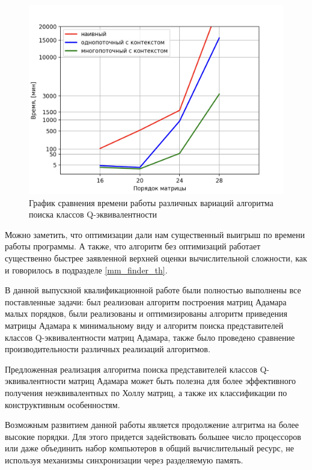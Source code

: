 \documentclass[a4paper, 14pt]{extreport}
\begin{document}
\begin{figure}[H]
    \centering
    \includegraphics[scale=0.6]{img/plot_result.png}
    \caption{График сравнения времени работы различных вариаций алгоритма поиска классов Q-эквивалентности}
    \label{fig:res_plot}
\end{figure}

Можно заметить, что оптимизации дали нам существенный выигрыш по времени работы программы. А также, что алгоритм без оптимизаций работает существенно быстрее заявленной верхней оценки вычислительной сложности, как и говорилось в подразделе \ref{mm_finder_th}.

\vkrConclution

В данной выпускной квалификационной работе были полностью выполнены все поставленные задачи: был реализован алгоритм построения матриц Адамара малых порядков, были реализованы и оптимизированы алгоритм приведения матрицы Адамара к минимальному виду и алгоритм поиска представителей классов Q-эквивалентности матриц Адамара, также было проведено сравнение производительности различных реализаций алгоритмов.

Предложенная реализация алгоритма поиска представителей классов Q-эквивалентности матриц Адамара может быть полезна для более эффективного получения неэквивалентных по Холлу матриц, а также их классификации по конструктивным особенностям.

Возможным развитием данной работы является продолжение алгритма на более высокие порядки. Для этого придется задействовать большее число процессоров или даже объединить набор компьютеров в общий вычислительный ресурс, не используя механизмы синхронизации через разделяемую память.

\vkrEnd
\end{document}
